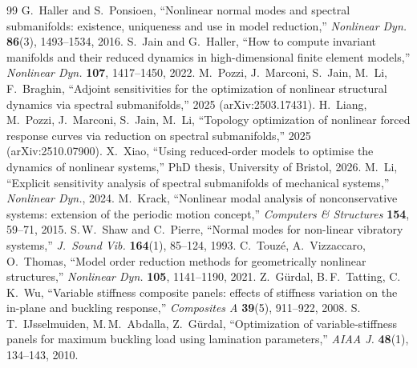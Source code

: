 \documentclass[11pt]{article}
\begin{document}
\begin{thebibliography}{99}
 G.\ Haller and S.\ Ponsioen, ``Nonlinear normal modes and
spectral submanifolds: existence, uniqueness and use in model reduction,''
\emph{Nonlinear Dyn.} \textbf{86}(3), 1493--1534, 2016.
 S.\ Jain and G.\ Haller, ``How to compute invariant manifolds
and their reduced dynamics in high-dimensional finite element models,''
\emph{Nonlinear Dyn.} \textbf{107}, 1417--1450, 2022.
 M.\ Pozzi, J.\ Marconi, S.\ Jain, M.\ Li, F.\ Braghin,
``Adjoint sensitivities for the optimization of nonlinear structural dynamics
via spectral submanifolds,'' 2025 (arXiv:2503.17431).
 H.\ Liang, M.\ Pozzi, J.\ Marconi, S.\ Jain, M.\ Li,
``Topology optimization of nonlinear forced response curves via reduction on
spectral submanifolds,'' 2025 (arXiv:2510.07900).
 X.\ Xiao, ``Using reduced-order models to optimise the
dynamics of nonlinear systems,'' PhD thesis, University of Bristol, 2026.
 M.\ Li, ``Explicit sensitivity analysis of spectral submanifolds
of mechanical systems,'' \emph{Nonlinear Dyn.}, 2024.
 M.\ Krack, ``Nonlinear modal analysis of nonconservative
systems: extension of the periodic motion concept,'' \emph{Computers \& Structures}
\textbf{154}, 59--71, 2015.
 S.\,W.\ Shaw and C.\ Pierre, ``Normal modes for non-linear
vibratory systems,'' \emph{J.\ Sound Vib.} \textbf{164}(1), 85--124, 1993.
 C.\ Touz\'e, A.\ Vizzaccaro, O.\ Thomas, ``Model order reduction
methods for geometrically nonlinear structures,'' \emph{Nonlinear Dyn.}
\textbf{105}, 1141--1190, 2021.
 Z.\ G\"urdal, B.\,F.\ Tatting, C.\,K.\ Wu, ``Variable stiffness
composite panels: effects of stiffness variation on the in-plane and buckling
response,'' \emph{Composites A} \textbf{39}(5), 911--922, 2008.
 S.\,T.\ IJsselmuiden, M.\,M.\ Abdalla, Z.\ G\"urdal,
``Optimization of variable-stiffness panels for maximum buckling load using
lamination parameters,'' \emph{AIAA J.} \textbf{48}(1), 134--143, 2010.
\end{thebibliography}
\end{document}
